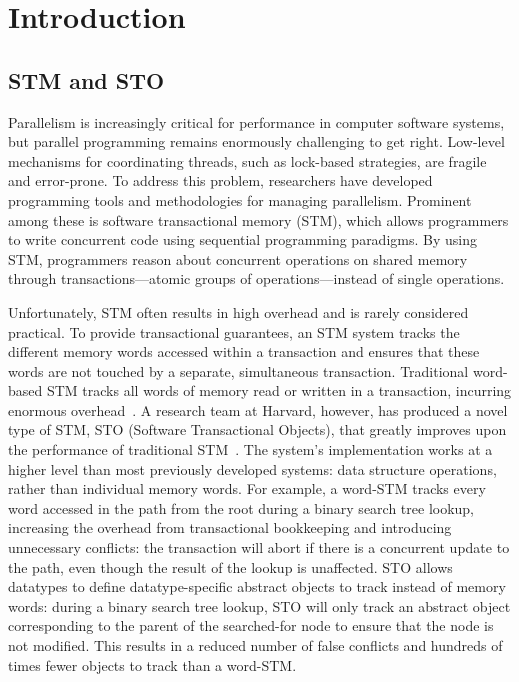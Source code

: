 \chapter{Introduction}
\section{STM and STO}
Parallelism is increasingly critical for performance in computer software systems, but parallel programming remains enormously challenging to get right. Low-level mechanisms for coordinating threads, such as lock-based strategies, are fragile and error-prone. To address this problem, researchers have developed programming tools and methodologies for managing parallelism. Prominent among these is software transactional memory (STM), which allows programmers to write concurrent code using sequential programming paradigms. By using STM, programmers reason about concurrent operations on shared memory through transactions---atomic groups of operations---instead of single operations. 

Unfortunately, STM often results in high overhead and is rarely considered practical. To provide transactional guarantees, an STM system tracks the different memory words accessed within a transaction and ensures that these words are not touched by a separate, simultaneous transaction. Traditional word-based STM tracks all words of memory read or written in a transaction, incurring enormous overhead~\cite{cascaval}. A research team at Harvard, however, has produced a novel type of STM, STO (Software Transactional Objects), that greatly improves upon the performance of traditional STM~\cite{sto}. The system's implementation works at a higher level than most previously developed systems: data structure operations, rather than individual memory words. For example, a word-STM tracks every word accessed in the path from the root during a binary search tree lookup, increasing the overhead from transactional bookkeeping and introducing unnecessary conflicts: the transaction will abort if there is a concurrent update to the path, even though the result of the lookup is unaffected. STO allows datatypes to define datatype-specific abstract objects to track instead of memory words: during a binary search tree lookup, STO will only track an abstract object corresponding to the parent of the searched-for node to ensure that the node is not modified. This results in a reduced number of false conflicts and hundreds of times fewer objects to track than a word-STM. 

